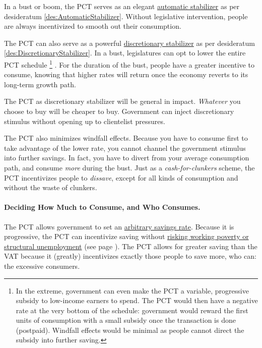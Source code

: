 
In a bust or boom, the PCT serves as an elegant \hyperref[des:AutomaticStabilizer]{automatic stabilizer} as per desideratum \ref{des:AutomaticStabilizer}.
Without legislative intervention, people are always incentivized to smooth out their consumption.

The PCT can also serve as a powerful \hyperref[des:DiscretionaryStabilizer]{discretionary stabilizer} as per desideratum \ref{des:DiscretionaryStabilizer}.
In a bust, legislatures can opt to lower the entire PCT schedule
\footnote{
	In the extreme, government can even make the PCT a variable, progressive subsidy to low-income earners to spend.
	The PCT would then have a negative rate at the very bottom of the schedule:
	government would reward the first units of consumption with a small subsidy once the transaction is done (postpaid).
	Windfall effects would be minimal as people cannot direct the subsidy into further saving.
}
.
For the duration of the bust, people have a greater incentive to consume, knowing that higher rates will return once the economy reverts to its long-term growth path.

The PCT as discretionary stabilizer will be general in impact.
\emph{Whatever} you choose to buy will be cheaper to buy.
Government can inject discretionary stimulus without opening up to clientelist pressures.

The PCT also minimizes windfall effects.
Because you have to consume first to take advantage of the lower rate, you cannot channel the government stimulus into further savings.
In fact, you have to divert from your average consumption path, and consume \emph{more} during the bust.
Just as a \emph{cash-for-clunkers} scheme, the PCT incentivizes people to \emph{dissave}, except for all kinds of consumption and without the waste of clunkers.

\paragraph{Deciding How Much to Consume, and Who Consumes.} The PCT allows government to set an \hyperref[des:Savings]{arbitrary savings rate}.
Because it is progressive, the PCT can incentivize saving without \hyperref[des:LowPriceFloor]{risking working poverty or structural unemployment} (see page \pageref{des:LowPriceFloor}).
The PCT allows for greater saving than the VAT because it (greatly) incentivizes exactly those people to save more, who can:
the excessive consumers.

